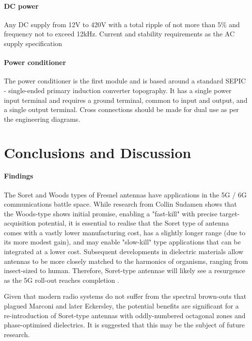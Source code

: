 \documentclass[review]{elsarticle}
\begin{document}
\paragraph{DC power} Any DC supply from 12V to 420V with a total ripple of not more than 5\% and frequency not to exceed 12kHz. Current and stability requirements as the AC supply specification
\paragraph{Power conditioner} The power conditioner is the first module and is based around a standard SEPIC - single-ended primary induction converter topography. It has a single power input terminal and requires a ground terminal, common to input and output, and a single output terminal. Cross connections should be made for dual use as per the engineering diagrams.

\section{Conclusions and Discussion}
\paragraph{Findings}
The Soret and Woods types of Fresnel antennas have applications in the 5G / 6G communications battle space. While research from Collin Sudamen shows that the Woods-type shows initial promise, enabling a "fast-kill" with precise target-acquisition potential, it is essential to realise that the Soret type of antenna comes with a vastly lower manufacturing cost, has a slightly longer range (due to its more modest gain), and may enable "slow-kill" type applications that can be integrated at a lower cost. \cite{KimChen2021} Subsequent developments in dielectric materials allow antennas to be more closely matched to the harmonics of organisms, ranging from insect-sized to human. Therefore, Soret-type antennae will likely see a resurgence as the 5G roll-out reaches completion \cite{Wallace2023}. 

Given that modern radio systems do not suffer from the spectral brown-outs that plagued Marconi and later Eckersley, the potential benefits are significant for a re-introduction of Soret-type antennas with oddly-numbered octagonal zones and phase-optimised dielectrics. It is suggested that this may be the subject of future research.


\end{document}
